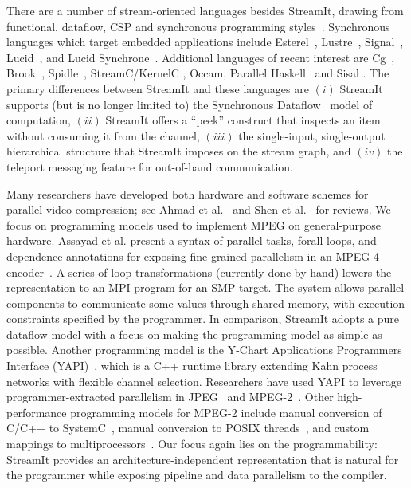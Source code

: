 There are a number of stream-oriented languages besides StreamIt,
drawing from functional, dataflow, CSP and synchronous programming
styles~\cite{survey97}.  Synchronous languages which target embedded
applications include Esterel~\cite{Esterel}, Lustre~\cite{Lustre},
Signal~\cite{Signal}, Lucid~\cite{Lucid77}, and Lucid
Synchrone~\cite{Lucid-Synchrone}.  Additional languages of recent
interest are Cg~\cite{cg03}, Brook~\cite{brook04},
Spidle~\cite{spidle03}, StreamC/KernelC \cite{imagine03ieee},
Occam\cite{Occam}, Parallel Haskell~\cite{ph} and Sisal \cite{sisal}.
The primary differences between StreamIt and these languages are $(i)$
StreamIt supports (but is no longer limited to) the Synchronous
Dataflow~\cite{lee87static} model of computation, $(ii)$ StreamIt
offers a ``peek'' construct that inspects an item without consuming it
from the channel, $(iii)$ the single-input, single-output hierarchical
structure that StreamIt imposes on the stream graph, and $(iv)$ the
teleport messaging feature for out-of-band communication.

Many researchers have developed both hardware and software schemes for
parallel video compression; see Ahmad et al.~\cite{ahmad01compression}
and Shen et al.~\cite{shen94overview} for reviews.  We focus on
programming models used to implement MPEG on general-purpose hardware.
Assayad et al. present a syntax of parallel tasks, forall loops, and
dependence annotations for exposing fine-grained parallelism in an
MPEG-4 encoder~\cite{assayad05mpeg4b}.  A series of loop
transformations (currently done by hand) lowers the representation to
an MPI program for an SMP target.  The system allows parallel
components to communicate some values through shared memory, with
execution constraints specified by the programmer.  In comparison,
StreamIt adopts a pure dataflow model with a focus on making the
programming model as simple as possible.  Another programming model is
the Y-Chart Applications Programmers Interface
(YAPI)~\cite{kock00yapi}, which is a C++ runtime library extending
Kahn process networks with flexible channel selection.  Researchers
have used YAPI to leverage programmer-extracted parallelism in
JPEG~\cite{kock02jpeg} and MPEG-2~\cite{dwivedi01exploring}.  Other
high-performance programming models for MPEG-2 include manual
conversion of C/C++ to SystemC~\cite{pazos04soc}, manual conversion to
POSIX threads~\cite{li05alpbench}, and custom mappings to
multiprocessors~\cite{ahmad01multiproc, iwata98coarse}.  Our focus
again lies on the programmability: StreamIt provides an
architecture-independent representation that is natural for the
programmer while exposing pipeline and data parallelism to the
compiler.


